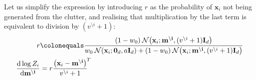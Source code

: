 \documentclass[11pt]{article}
\newcommand{\vek}[1]{\ensuremath{\mathbf{#1}}}
\newcommand{\byd}{\ensuremath{\mathrm{d}}}
\newcommand{\norm}{\ensuremath{\:\mathcal{N}}}
\newcommand{\unity}{\ensuremath{\mathbf{I}}}
\begin{document}
Let us simplify the expression by introducing $r$ as the probability of 
$\vek{x}_i$ not being generated from the clutter, and realising that 
multiplication by the last term is equivalent to division by 
$(v^{\setminus i} + 1)$:
\begin{align}
	r &\colonequals
			\frac{(1 - w_0)
				\norm\!\left(\vek{x}_i; \vek{m^{\setminus i}}, (v^{\setminus i} 
							+ 1)\unity_{d}\right)
				}
			{w_0  \norm(\vek{x}_i; \vek{0}_d, a\unity_{d})
			+  (1 - w_0)\norm\!\left(\vek{x}_i; \vek{m^{\setminus i}}, (v^{\setminus i} 
			+ 1)\unity_{d}\right)
			}\\
	\frac{\byd \log Z_i}{\byd \vek{m^{\setminus i}}} &=
		r\frac{\big(\vek{x}_i - \vek{m^{\setminus 
					i}}\rlap{$\big)^T$}\hphantom{\big)}}
					{v^{\setminus i} + 1}
\end{align}
\end{document}
